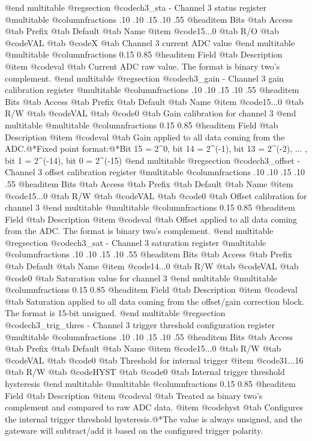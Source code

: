 @end multitable
@regsection @code{ch3_sta} - Channel 3 status register
@multitable @columnfractions .10 .10 .15 .10 .55
@headitem Bits @tab Access @tab Prefix @tab Default @tab Name
@item @code{15...0}
@tab R/O @tab
@code{VAL}
@tab @code{X} @tab 
Channel 3 current ADC value
@end multitable
@multitable @columnfractions 0.15 0.85
@headitem Field @tab Description
@item @code{val} @tab Current ADC raw value. The format is binary two's complement.
@end multitable
@regsection @code{ch3_gain} - Channel 3 gain calibration register
@multitable @columnfractions .10 .10 .15 .10 .55
@headitem Bits @tab Access @tab Prefix @tab Default @tab Name
@item @code{15...0}
@tab R/W @tab
@code{VAL}
@tab @code{0} @tab 
Gain calibration for channel 3
@end multitable
@multitable @columnfractions 0.15 0.85
@headitem Field @tab Description
@item @code{val} @tab Gain applied to all data coming from the ADC.@*Fixed point format:@*Bit 15 = 2^0, bit 14 = 2^(-1), bit 13 = 2^(-2), ... , bit 1 = 2^(-14), bit 0 = 2^(-15)
@end multitable
@regsection @code{ch3_offset} - Channel 3 offset calibration register
@multitable @columnfractions .10 .10 .15 .10 .55
@headitem Bits @tab Access @tab Prefix @tab Default @tab Name
@item @code{15...0}
@tab R/W @tab
@code{VAL}
@tab @code{0} @tab 
Offset calibration for channel 3
@end multitable
@multitable @columnfractions 0.15 0.85
@headitem Field @tab Description
@item @code{val} @tab Offset applied to all data coming from the ADC. The format is binary two's complement.
@end multitable
@regsection @code{ch3_sat} - Channel 3 saturation register
@multitable @columnfractions .10 .10 .15 .10 .55
@headitem Bits @tab Access @tab Prefix @tab Default @tab Name
@item @code{14...0}
@tab R/W @tab
@code{VAL}
@tab @code{0} @tab 
Saturation value for channel 3
@end multitable
@multitable @columnfractions 0.15 0.85
@headitem Field @tab Description
@item @code{val} @tab Saturation applied to all data coming from the offset/gain correction block. The format is 15-bit unsigned.
@end multitable
@regsection @code{ch3_trig_thres} - Channel 3 trigger threshold configuration register
@multitable @columnfractions .10 .10 .15 .10 .55
@headitem Bits @tab Access @tab Prefix @tab Default @tab Name
@item @code{15...0}
@tab R/W @tab
@code{VAL}
@tab @code{0} @tab 
Threshold for internal trigger
@item @code{31...16}
@tab R/W @tab
@code{HYST}
@tab @code{0} @tab 
Internal trigger threshold hysteresis
@end multitable
@multitable @columnfractions 0.15 0.85
@headitem Field @tab Description
@item @code{val} @tab Treated as binary two's complement and compared to raw ADC data.
@item @code{hyst} @tab Configures the internal trigger threshold hysteresis.@*The value is always unsigned, and the gateware will subtract/add it based on the configured trigger polarity.
